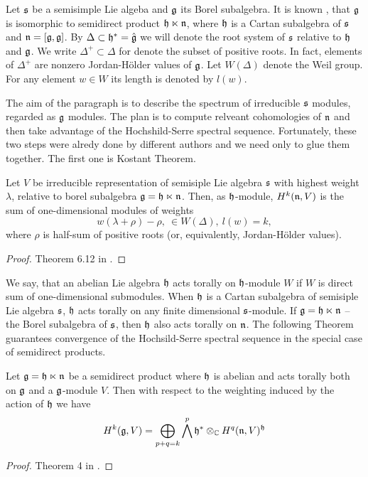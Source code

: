 Let $\mathfrak{s}$ be a semisimple Lie algeba and $\mathfrak{g}$ its Borel subalgebra. It is known
\cite{humphreys}, that $\mathfrak{g}$ is isomorphic to semidirect product $\mathfrak{h} \ltimes \mathfrak{n}$, where
$\mathfrak{h}$ is a Cartan subalgebra of $\mathfrak{s}$ and $\mathfrak{n} = [\mathfrak{g}, \mathfrak{g}]$. By $\Delta \subset \mathfrak{h}^*
= \hat{\mathfrak{g}}$ we will denote the root system of $\mathfrak{s}$ relative to $\mathfrak{h}$ and $\mathfrak{g}$. We write
$\Delta^+ \subset \Delta$ for denote the subset of positive roots. In fact, elements of $\Delta^+$
are nonzero Jordan-H\"older values of $\mathfrak{g}$. Let $W(\Delta)$ denote the Weil group. For any
element $w\in W$ its length is denoted by $l(w)$. 

The aim of the paragraph is to describe the spectrum of irreducible $\mathfrak{s}$ modules, regarded
as $\mathfrak{g}$ modules. The plan is to compute relveant cohomologies of $\mathfrak{n}$ and then take advantage
of the Hochshild-Serre spectral sequence. Fortunately, these two steps were alredy done by
different authors and we need only to glue them together. The first one is Kostant Theorem.
\begin{theorem}[Kostant]
   Let $V$ be irreducible representation of semisiple Lie algebra $\mathfrak{s}$ with highest weight
   $\lambda$, relative to borel subalgebra $\mathfrak{g} = \mathfrak{h} \ltimes \mathfrak{n}$. Then, as $\mathfrak{h}$-module,
   $H^k(\mathfrak{n}, V)$ is the sum of one-dimensional modules of weights
   \[
       w(\lambda + \rho) - \rho,~\in W(\Delta), ~l(w) = k,
   \]
   where $\rho$ is half-sum of positive roots (or, equivalently, Jordan-H\"older values).
\end{theorem}
\begin{proof}
    Theorem 6.12 in \cite{knapp}.
\end{proof}
We say, that an abelian Lie algebra $\mathfrak{h}$ acts torally on $\mathfrak{h}$-module $W$ if $W$ is direct sum
of one-dimensional submodules. When $\mathfrak{h}$ is a Cartan subalgebra of semisiple Lie algebra
$\mathfrak{s}$, $\mathfrak{h}$ acts torally on any finite dimensional $\mathfrak{s}$-module. If $\mathfrak{g} = \mathfrak{h} \ltimes
\mathfrak{n}$ -- the Borel subalgebra of $\mathfrak{s}$, then $\mathfrak{h}$ also acts torally on $\mathfrak{n}$. The following
Theorem guarantees convergence of the Hochsild-Serre spectral sequence in the special case of
semidirect products.
\begin{theorem}
    Let $\mathfrak{g}=\mathfrak{h}\ltimes\mathfrak{n}$ be a semidirect product where $\mathfrak{h}$ is abelian and acts torally
    both on $\mathfrak{g}$ and a $\mathfrak{g}$-module $V$. Then with respect to the weighting induced by the
    action of $\mathfrak{h}$ we have 
    \begin{equation} \label{t:coll:1}
        H^k(\mathfrak{g}, V) = \bigoplus_{p + q = k} \bigwedge^p\mathfrak{h}^* \otimes_{\mathbb{C}} H^q(\mathfrak{n}, V)^{\mathfrak{h}}
    \end{equation} 
\end{theorem}
\begin{proof}
    Theorem 4 in \cite{coll}. 
\end{proof}

